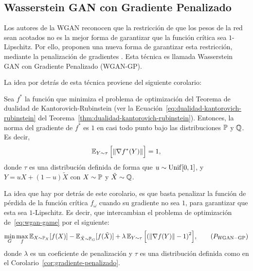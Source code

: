 
\subsection{Wasserstein GAN con Gradiente Penalizado}\label{ssec:wgan-gp}  %
Los autores de la WGAN reconocen que la restricción de que los pesos de la red sean acotados no es la mejor forma de garantizar que la función crítica sea $1$-Lipschitz. Por ello, proponen una nueva forma de garantizar esta restricción, mediante la penalización de gradientes \cite{gulrajani2017improved}. Esta técnica es llamada Wasserstein GAN con Gradiente Penalizado (WGAN-GP).

La idea por detrás de esta técnica proviene del siguiente corolario:

\begin{corollary}\label{cor:gradiente-penalizado}
    Sea $f^\ast$ la función que minimiza el problema de optimización del Teorema de dualidad de Kantorovich-Rubinstein (ver la Ecuación~\eqref{eq:dualidad-kantorovich-rubinstein} del Teorema~\ref{thm:dualidad-kantorovich-rubinstein}). Entonces, la norma del gradiente de $f^\ast$ es $1$ en casi todo punto bajo las distribuciones $\Prob$ y $\ProbQ$. Es decir,
    \begin{equation}
        \Exp_{Y\sim\tau} \qty\Big[ \norm{\nabla f^\ast(Y)} ] = 1,
    \end{equation}
    donde $\tau$ es una distribución definida de forma que $u\sim\mathrm{Unif}[0, 1]$, y $Y = uX + (1-u)\tilde X$ con $X\sim\Prob$ y $\tilde X\sim\ProbQ$.
\end{corollary}

La idea que hay por detrás de este corolario, es que basta penalizar la función de pérdida de la función crítica $f_\omega$ cuando su gradiente no sea $1$, para garantizar que esta sea $1$-Lipschitz. Es decir, que intercambian el problema de optimización de~\eqref{eq:wgan-game} por el siguiente:
\begin{equation}
    \min_{G} \max_{f} \Exp_{X\sim \Prob_X} [f(X)] - \Exp_{\tilde X \sim \Prob_G} [f(\tilde X)] + \lambda \Exp_{Y\sim\tau} \qty\Big[ \qty(\norm{\nabla f(Y)} - 1)^2 ],\tag{$P_{\mathrm{WGAN-GP}}$}
\end{equation}
donde $\lambda$ es un coeficiente de penalización y $\tau$ es una distribución definida como en el Corolario~\ref{cor:gradiente-penalizado}.

